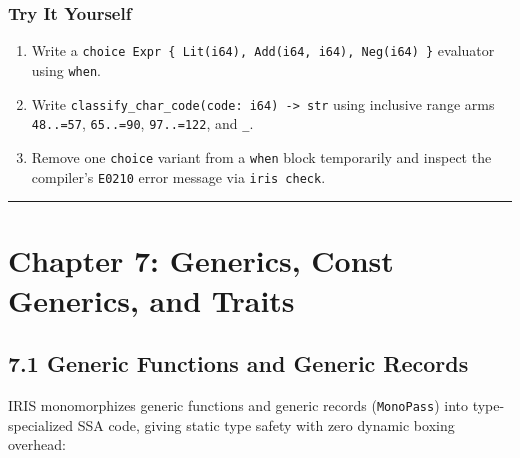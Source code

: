 \documentclass[
  english,
  oneside]{book}
\providecommand{\tightlist}{%
  \setlength{\itemsep}{0pt}\setlength{\parskip}{0pt}}
\begin{document}
\subsection{Try It Yourself}\label{try-it-yourself-5}

\begin{enumerate}
\def\labelenumi{\arabic{enumi}.}
\tightlist
\item
  Write a
  \texttt{choice\ Expr\ \{\ Lit(i64),\ Add(i64,\ i64),\ Neg(i64)\ \}}
  evaluator using \texttt{when}.
\item
  Write \texttt{classify\_char\_code(code:\ i64)\ -\textgreater{}\ str}
  using inclusive range arms \texttt{48..=57}, \texttt{65..=90},
  \texttt{97..=122}, and \texttt{\_}.
\item
  Remove one \texttt{choice} variant from a \texttt{when} block
  temporarily and inspect the compiler's \texttt{E0210} error message
  via \texttt{iris\ check}.
\end{enumerate}

\begin{center}\rule{0.5\linewidth}{0.5pt}\end{center}

\chapter{Chapter 7: Generics, Const Generics, and
Traits}\label{chapter-7-generics-const-generics-and-traits}

\section{7.1 Generic Functions and Generic
Records}\label{generic-functions-and-generic-records}

IRIS monomorphizes generic functions and generic records
(\texttt{MonoPass}) into type-specialized SSA code, giving static type
safety with zero dynamic boxing overhead:
\end{document}
